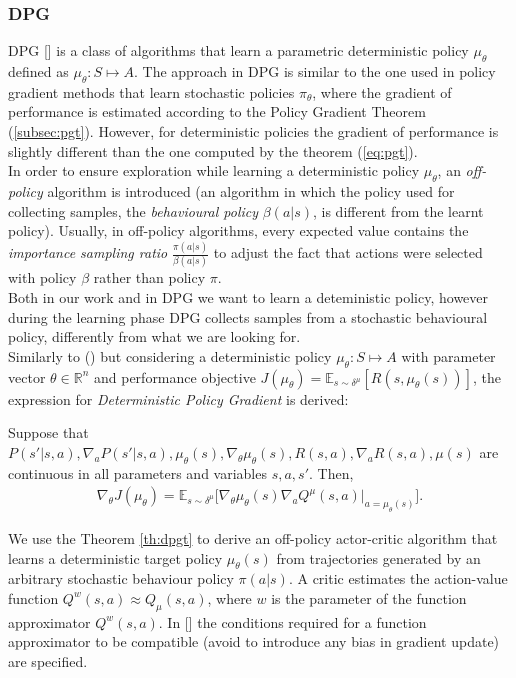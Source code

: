 \subsubsection{DPG} \label{subsec:dpg}
\acf{DPG} [\citet{article}] is a class of algorithms that learn a parametric deterministic policy $\mu_{\theta}$ defined as $\mu_{\theta}: S \mapsto A$. The approach in \ac{DPG} is similar to the one used in policy gradient methods that learn stochastic policies $\pi_{\theta}$, where the gradient of performance is estimated according to the Policy Gradient Theorem (\ref{subsec:pgt}). However, for deterministic policies the gradient of performance is slightly different than the one computed by the theorem (\ref{eq:pgt}).\\
\newline
In order to ensure exploration while learning a deterministic policy $\mu_{\theta}$, an \emph{off-policy} algorithm is introduced (\ie an algorithm in which the policy used for collecting samples, the \emph{behavioural policy} $\beta(a|s)$, is different from the learnt policy). Usually, in off-policy algorithms, every expected value contains the \emph{importance sampling ratio} $\frac{\pi(a|s)}{\beta(a|s)}$ to adjust the fact that actions were selected with policy $\beta$ rather than policy $\pi$.\\
\newline
Both in our work and in \ac{DPG} we want to learn a deteministic policy, however during the learning phase \ac{DPG} collects samples from a stochastic behavioural policy, differently from what we are looking for.\\
\newline
Similarly to () but considering a deterministic policy $\mu_{\theta}: S \mapsto A$ with parameter vector $\theta \in \mathbb{R}^n$ and performance objective $J(\mu_{\theta}) = \mathbb{E}_{s \sim \delta^{\mu}}[R(s, \mu_{\theta}(s))]$, the expression for \emph{Deterministic Policy Gradient} is derived:
\begin{theorem} \label{th:dpgt}
	Suppose that $P(s'|s,a), \nabla_aP(s'|s,a), \mu_{\theta}(s), \nabla_{\theta} \mu_{\theta}(s), R(s,a), \nabla_a R(s,a), \mu(s)$  are continuous in all parameters and variables $s, a, s'$. Then, 
	\begin{align}
	\nabla_{\theta}J(\mu_{\theta}) = \mathbb{E}_{s \sim \delta^{\mu}} \Big[\nabla_{\theta} \mu_{\theta} (s) \nabla_a Q^{\mu}(s,a)|_{a = \mu_{\theta} (s)}\Big].
	\end{align}
\end{theorem}
\noindent We use the Theorem \ref{th:dpgt} to derive an off-policy actor-critic algorithm that learns a deterministic target policy $\mu_{\theta}(s)$ from trajectories generated by an arbitrary stochastic behaviour policy $\pi(a|s)$. A critic estimates the action-value function $Q^w(s,a) \approx Q_{\mu}(s,a)$, where $w$ is the parameter of the function approximator $Q^w(s,a)$. In [\citet{article}] the conditions required for a function approximator to be compatible (\ie avoid to introduce any bias in gradient update) are specified.

